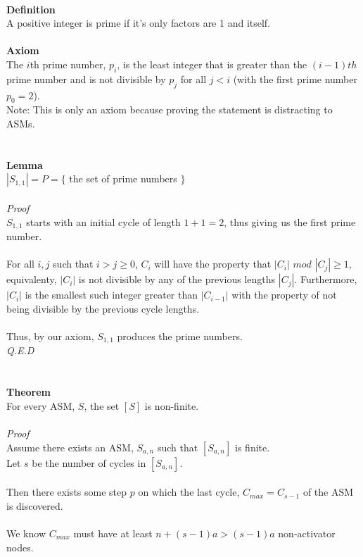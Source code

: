 \documentclass[a4paper,12pt]{article}
\begin{document}
\\
\textbf{Definition}\\
A positive integer is prime if it's only factors are 1 and itself.\\
\\
\textbf{Axiom}\\
The $i$th prime number, $p_i$, is the least integer that is greater than the $(i-1)th$ prime number and is not divisible by $p_j$ for all $j < i$ (with the first prime number $p_0=2$).\\ 
Note: This is only an axiom because proving the statement is distracting to ASMs.\\
\\
\\
\textbf{Lemma}\\
$|S_{1,1}| = P = \{$ the set of prime numbers $\}$\\
\\
\textit{Proof}\\
$S_{1,1}$ starts with an initial cycle of length $1 + 1 = 2$, thus giving us the first prime number.\\
\\
For all $i, j$ such that $i > j \geq 0$, $C_i$ will have the property that $|C_i|$ $mod$ $|C_j| \geq 1$, equivalenty, $|C_i|$ is not divisible by any of the previous lengths $|C_j|$. Furthermore, $|C_i|$ is the smallest such integer greater than $|C_{i-1}|$ with the property of not being divisible by the previous cycle lengths.\\
\\
Thus, by our axiom, $S_{1,1}$ produces the prime numbers.\\
\textit{Q.E.D}\\ 
\\
\\
\textbf{Theorem}\\
For every ASM, $S$, the set $[S]$ is non-finite.\\
\\
\textit{Proof}\\  
Assume there exists an ASM, $S_{a,n}$ such that $[S_{a,n}]$ is finite.\\
Let $s$ be the number of cycles in $[S_{a,n}]$.\\
\\
Then there exists some step $p$ on which the last cycle, $C_{max}=C_{s-1}$ of the ASM is discovered.\\
\\
We know $C_{max}$ must have at least $n + (s-1)a > (s-1)a$ non-activator nodes.\\
\end{document}
